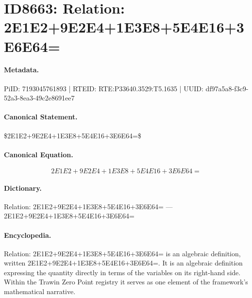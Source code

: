 \section*{ID8663: Relation: 2E1E2+9E2E4+1E3E8+5E4E16+3E6E64=}
\paragraph{Metadata.}
PiID: 7193045761893 | RTEID: RTE:P33640.3529:T5.1635 | UUID: df97a5a8-f3c9-52a3-8ea3-49c2e8691ee7

\paragraph{Canonical Statement.}
\$2E1E2+9E2E4+1E3E8+5E4E16+3E6E64=\$

\paragraph{Canonical Equation.}
\[
2E1E2+9E2E4+1E3E8+5E4E16+3E6E64=
\]

\paragraph{Dictionary.}
Relation: 2E1E2+9E2E4+1E3E8+5E4E16+3E6E64= — 2E1E2+9E2E4+1E3E8+5E4E16+3E6E64=

\paragraph{Encyclopedia.}
Relation: 2E1E2+9E2E4+1E3E8+5E4E16+3E6E64= is an algebraic definition, written 2E1E2+9E2E4+1E3E8+5E4E16+3E6E64=. It is an algebraic definition expressing the quantity directly in terms of the variables on its right-hand side. Within the Trawin Zero Point registry it serves as one element of the framework's mathematical narrative.
